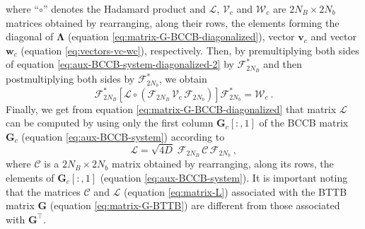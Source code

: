 where ``$\circ$'' denotes the Hadamard product \cite[e.g.,][p. 298]{horn-johnson1991} and 
$\boldsymbol{\mathcal{L}}$, $\boldsymbol{\mathcal{V}}_{c}$ and $\boldsymbol{\mathcal{W}}_{c}$ are 
$2N_{B} \times 2N_{b}$ matrices obtained 
by rearranging, along their rows, the elements forming the diagonal of 
$\boldsymbol{\Lambda}$ (equation \ref{eq:matrix-G-BCCB-diagonalized}), vector $\mathbf{v}_{c}$ and 
vector $\mathbf{w}_{c}$ (equation \ref{eq:vectors-vc-wc}), respectively.
Then, by premultiplying both sides of equation \ref{eq:aux-BCCB-system-diagonalized-2} 
by $\boldsymbol{\mathcal{F}}_{2N_{B}}^{\ast}$ and then postmultiplying both sides by 
$\boldsymbol{\mathcal{F}}_{2N_{b}}^{\ast}$, we obtain
\begin{equation}
	\boldsymbol{\mathcal{F}}_{2N_{B}}^{\ast} \left[ \boldsymbol{\mathcal{L}} \circ 
	\left( \boldsymbol{\mathcal{F}}_{2N_{B}} \, \boldsymbol{\mathcal{V}}_{c} \, \boldsymbol{\mathcal{F}}_{2N_{b}} \right)
	\right] \boldsymbol{\mathcal{F}}_{2N_{b}}^{\ast} = \boldsymbol{\mathcal{W}}_{c} \: .
	\label{eq:aux-BCCB-system-diagonalized-3}
\end{equation}
Finally, we get from equation \ref{eq:matrix-G-BCCB-diagonalized} that 
matrix $\boldsymbol{\mathcal{L}}$ can be computed by using only the first column 
$\mathbf{G}_{c}[:,1]$ of the BCCB matrix $\mathbf{G}_{c}$ (equation \ref{eq:aux-BCCB-system})
according to \citep{takahashi-etal2020}
\begin{equation}
	\boldsymbol{\mathcal{L}} = \sqrt{4D} \; 
	\boldsymbol{\mathcal{F}}_{2N_{B}} \, \boldsymbol{\mathcal{C}} \, \boldsymbol{\mathcal{F}}_{2N_{b}} \: ,
	\label{eq:matrix-L}
\end{equation}
where $\boldsymbol{\mathcal{C}}$ is a $2N_{B} \times 2N_{b}$ matrix obtained 
by rearranging, along its rows, the elements of $\mathbf{G}_{c}[:,1]$ (equation \ref{eq:aux-BCCB-system}).
It is important noting that the matrices $\boldsymbol{\mathcal{C}}$ and $\boldsymbol{\mathcal{L}}$ (equation \ref{eq:matrix-L}) 
associated with the BTTB matrix $\mathbf{G}$ (equation \ref{eq:matrix-G-BTTB}) are different from those associated with $\mathbf{G}^{\top}$.

